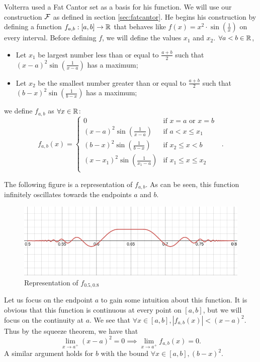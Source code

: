 \documentclass{article}
\theoremstyle{axiom} \newtheorem{axiom}{Axiom}
\theoremstyle{definition} \newtheorem{definition}{Definition}
\theoremstyle{example} \newtheorem{example}{Example}
\theoremstyle{proposition} \newtheorem{prop}{Proposition}
\theoremstyle{lemma} \newtheorem{lemma}{Lemma}
\begin{document}
Volterra used a Fat Cantor set as a basis for his function. We will use our
construction $\mathcal{F}$ as defined in section \ref{sec:fatcantor}. He begins his
construction by defining a function $f_{a,b}:[a,b] \rightarrow \mathbb{R}$ that behaves
like $f(x) = x^2\cdot \sin(\frac{1}{x})$ on every interval. 
Before defining $f$, we will define the values $x_1$ and $x_2$.  $\forall a<b \in\mathbb{R}$,
\begin{itemize}
	\item Let $x_1$ be largest number less than or equal to 
$\frac{a+b}{2}$ such that $(x-a)^2\sin(\frac{1}{x-a})$ has a maximum;
\item Let $x_2$ be the smallest number greater than or equal to $\frac{a+b}{2}$ such that
	$(b-x)^2\sin(\frac{1}{b-x})$ has a maximum;
\end{itemize}
we define $f_{a,b}$ as $\forall x \in \mathbb{R}$:
\begin{equation}
	f_{a,b}(x) = \begin{cases}
			0 & \text{if $x=a$ or $x=b$ }\\
			(x-a)^2\sin(\frac{1}{x-a}) & \text{if $a< x \leq x_1$ } \\
			(b-x)^2\sin(\frac{1}{b-x}) & \text{if $x_2 \leq x < b$ } \\
			(x-x_1)^2\sin(\frac{1}{x_1-a}) & \text{if $x_1 \leq x \leq x_2$ } \\
		\end{cases}.
\end{equation}

The following figure is a representation of $f_{a,b}$. As can be seen, this
function infinitely oscillates towards the endpoints $a$ and $b$.
\begin{figure}[H]
	\centering
	\includegraphics[scale=0.4]{img/volterra.png}
	\caption{Representation of $f_{0.5,0.8}$}
\end{figure}

Let us focus on the endpoint $a$ to gain some intuition about this function. 
It is obvious that this function is continuous at every point on $[a,b]$, but 
we will focus on the continuity at $a$. We see that $\forall x \in [a,b],
|f_{a,b}(x)| < (x-a)^2$. Thus by the squeeze theorem, we have that 
\begin{equation*}
	\lim_{x\rightarrow a^+} (x-a)^2 = 0 \implies \lim_{x\rightarrow a^+} f_{a,b}(x) = 0.
\end{equation*}
A similar argument holds for $b$ with the bound $\forall x\in [a,b], (b-x)^2$.
\end{document}
